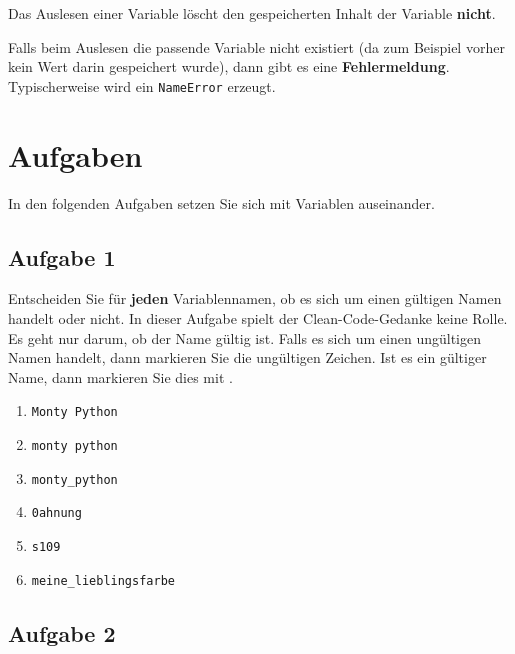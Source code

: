 \begin{important}
	Das Auslesen einer Variable löscht den gespeicherten Inhalt der Variable \textbf{nicht}.
\end{important}

\begin{hinweis}
	Falls beim Auslesen die passende Variable nicht existiert (da zum Beispiel vorher kein Wert darin gespeichert wurde), dann gibt es eine \textbf{Fehlermeldung}. Typischerweise wird ein \texttt{NameError} erzeugt.
\end{hinweis}


\section{Aufgaben}

In den folgenden Aufgaben setzen Sie sich mit Variablen auseinander.

\subsection{Aufgabe 1}

Entscheiden Sie für \textbf{jeden} Variablennamen, ob es sich um einen gültigen Namen handelt oder nicht. In dieser Aufgabe spielt der Clean-Code-Gedanke keine Rolle. Es geht nur darum, ob der Name gültig ist. Falls es sich um einen ungültigen Namen handelt, dann markieren Sie die ungültigen Zeichen. Ist es ein gültiger Name, dann markieren Sie dies mit \checkmark.

\begin{multicols}{2}
\begin{enumerate}
\item \lstinline{Monty Python}
\item \lstinline{monty python}
\item \lstinline{monty_python}
\item \lstinline{0ahnung}
\item \lstinline{s109}
\item \lstinline{meine_lieblingsfarbe}
\end{enumerate}
\end{multicols}

\subsection{Aufgabe 2}

